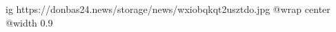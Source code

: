  
 
 
 
 

\ifcmt
  ig https://donbas24.news/storage/news/wxiobqkqt2usztdo.jpg
  @wrap center
  @width 0.9
\fi
